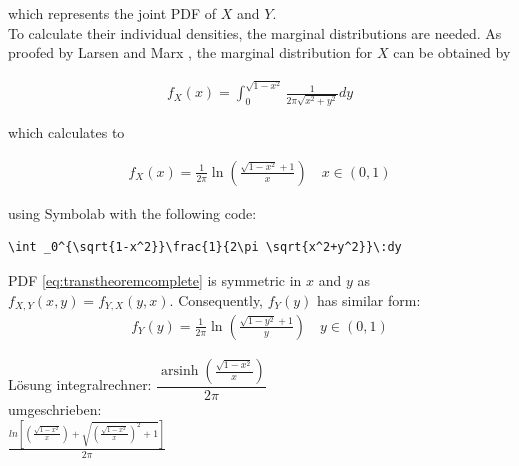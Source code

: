 which represents the joint PDF of $X$ and $Y$.\\
To calculate their individual densities, the marginal distributions are needed. As proofed by Larsen and Marx \cite[Theorem~3.7.2]{larsen2005introduction}, the marginal distribution for $X$ can be obtained by 

\begin{equation}
\begin{split}
f_{X}(x) = \int_{0}^{\sqrt{1-x^2}}\frac{1}{2\pi\sqrt{x^2+y^2}} dy
\end{split}
\label{eq:marginalX}
\end{equation}

which calculates to 

\begin{equation}
\begin{split}
f_{X}(x) = \frac{1}{2\pi }\ln \left(\frac{\sqrt{1-x^2}+1}{x}\right) \quad x \in (0,1)
\end{split}
\label{eq:marginalXcalculated}
\end{equation}

using Symbolab \cite{symbolab} with the following code:
\begin{lstlisting}
\int _0^{\sqrt{1-x^2}}\frac{1}{2\pi \sqrt{x^2+y^2}}\:dy
\end{lstlisting}

PDF \eqref{eq:transtheoremcomplete} is symmetric in $x$ and $y$ as $f_{X,Y}(x,y) = f_{Y,X}(y,x)$. Consequently, $f_Y(y)$ has similar form:
\begin{equation}
\begin{split}
f_{Y}(y) = \frac{1}{2\pi }\ln\left(\frac{\sqrt{1-y^2}+1}{y}\right) \quad y \in (0,1)
\end{split}
\label{eq:marginalYcalculated}
\end{equation}

Lösung integralrechner:
$\dfrac{\operatorname{arsinh}\left(\frac{\sqrt{1-x^2}}{x}\right)}{2{\pi}}$\\
umgeschrieben:\\
$\frac{ln\left[\left(\frac{\sqrt{1-x^2}}{x}\right)+\sqrt{\left(\frac{\sqrt{1-x^2}}{x}\right)^2+1}\right]}{2\pi}$

